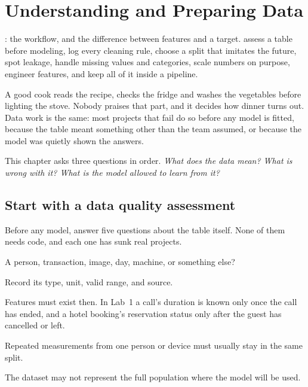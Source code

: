 \chapter{Understanding and Preparing Data}
\label{ch:data}

\chapterguide%
  {: the workflow, and the difference between features and a target.}
  {assess a table before modeling, log every cleaning rule, choose a split that imitates the future, spot leakage, handle missing values and categories, scale numbers on purpose, engineer features, and keep all of it inside a pipeline.}

A good cook reads the recipe, checks the fridge and washes the vegetables before lighting the stove. Nobody praises that part, and it decides how dinner turns out. Data work is the same: most projects that fail do so before any model is fitted, because the table meant something other than the team assumed, or because the model was quietly shown the answers.

This chapter asks three questions in order. \emph{What does the data mean? What is wrong with it? What is the model allowed to learn from it?}

\section{Start with a data quality assessment}

Before any model, answer five questions about the table itself. None of them needs code, and each one has sunk real projects.

\begin{utpsteps}
  \item {} A person, transaction, image, day, machine, or something else?
  \item {} Record its type, unit, valid range, and source.
  \item {} Features must exist then. In Lab~1 a call's duration is known only once the call has ended, and a hotel booking's reservation status only after the guest has cancelled or left.
  \item {} Repeated measurements from one person or device must usually stay in the same split.
  \item {} The dataset may not represent the full population where the model will be used.
\end{utpsteps}

